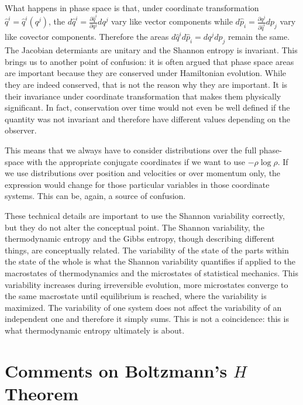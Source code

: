 \documentclass{article}
\begin{document}
What happens in phase space is that, under coordinate transformation $\hat{q}^i = \hat{q}^i(q^j)$, the $d\hat{q}^i = \frac{\partial \hat{q}^i}{\partial q^j } dq^j$ vary like vector components while $d\hat{p}_i = \frac{\partial q^j}{\partial \hat{q}^i } dp_j$ vary like covector components. Therefore the areas $d\hat{q}^i d\hat{p}_i = dq^j dp_j$ remain the same. The Jacobian determiants are unitary and the Shannon entropy is invariant. This brings us to another point of confusion: it is often argued that phase space areas are important because they are conserved under Hamiltonian evolution. While they are indeed conserved, that is not the reason why they are important. It is their invariance under coordinate transformation that makes them physically significant. In fact, conservation over time would not even be well defined if the quantity was not invariant and therefore have different values depending on the observer.

This means that we always have to consider distributions over the full phase-space with the appropriate conjugate coordinates if we want to use $-\rho \log \rho$. If we use distributions over position and velocities or over momentum only, the expression would change for those particular variables in those coordinate systems. This can be, again, a source of confusion.

These technical details are important to use the Shannon variability correctly, but they do not alter the conceptual point. The Shannon variability, the thermodynamic entropy and the Gibbs entropy, though describing different things, are conceptually related. The variability of the state of the parts within the state of the whole is what the Shannon variability quantifies if applied to the macrostates of thermodynamics and the microstates of statistical mechanics. This variability increases during irreversible evolution, more microstates converge to the same macrostate until equilibrium is reached, where the variability is maximized. The variability of one system does not affect the variability of an independent one and therefore it simply sums. This is not a coincidence: this is what thermodynamic entropy ultimately is about.

\section{Comments on Boltzmann's $H$ Theorem}
\end{document}
